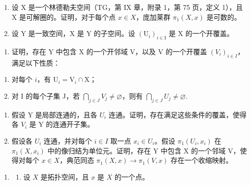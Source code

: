 \exercisegroup

\begin{enumerate}
\def\labelenumi{\arabic{enumi})}
\item
  设 X 是一个林德勒夫空间（TG，第 IX 章，附录 1，第 75 页，定义 1），且 X 是可解圈的。证明，对于每个点 \(x \in X\)，庞加莱群 \(\pi_1(X, x)\) 是可数的。
\item
  设 Y 是一致空间，X 是 Y 的子空间。设 \((\mathrm{U}_{i})_{i\in\mathrm{I}}\) 是 X 的一个开覆盖。
\end{enumerate}

\begin{enumerate}
\def\labelenumi{\alph{enumi})}
\tightlist
\item
  证明，存在 Y 中包含 X 的一个开邻域 V，以及 V 的一个开覆盖 \((V_{i})_{i\in I}\)，满足以下性质：
\end{enumerate}

\begin{enumerate}
\def\labelenumi{(\roman{enumi})}
\item
  对每个 \(i\)，有 \(\mathrm{U}_i = \mathrm{V}_i \cap \mathrm{X}\)；
\item
  对 I 的每个子集 J，若 \(\bigcap_{j\in J}V_j\neq \varnothing\)，则有 \(\bigcap_{j\in J}U_j\neq \varnothing .\)
\end{enumerate}

\begin{enumerate}
\def\labelenumi{\alph{enumi})}
\setcounter{enumi}{1}
\item
  假设 Y 是局部连通的，且各 \(U_{i}\) 连通。证明，存在满足这些条件的覆盖，使得各 \(V_{i}\) 是 Y 的连通开子集。
\item
  假设各 \(U_{i}\) 连通，并对每个 \(i \in I\) 取一点 \(x_{i} \in U_{i}\)。假设 \(\pi_{1}(U_{i}, x_{i})\) 在 \(\pi_{1}(X, x_{i})\) 中的像归结为单位元。证明，存在 Y 中包含 X 的一个邻域 V，使得对每个 \(x \in X\)，典范同态 \(\pi_{1}(X, x) \to \pi_{1}(V, x)\) 存在一个收缩映射。
\end{enumerate}

\begin{enumerate}
\def\labelenumi{\arabic{enumi})}
\setcounter{enumi}{2}
\tightlist
\item
  \begin{enumerate}
  \def\labelenumii{(\arabic{enumii})}
  \setcounter{enumii}{2}
  \tightlist
  \item
    设 \(X\) 是拓扑空间，且 \(x\) 是 \(X\) 的一个点。
  \end{enumerate}
\end{enumerate}

